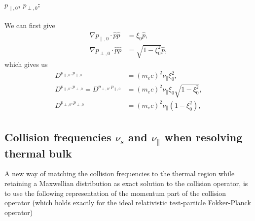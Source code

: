 \documentclass[11pt,a4paper]{article}
\begin{document}
\paragraph{$p_{\parallel,0}$, $p_{\perp,0}$:}
We can first give
\begin{align}
\nabla p_{\parallel,0} \cdot \hat{p}\hat{p} &= \xi_0 \hat{p} , \nonumber \\
\nabla p_{\perp,0} \cdot \hat{p}\hat{p} &= \sqrt{1-\xi_0^2}\hat{p},
\end{align}
which gives us
\begin{align}
D^{p_{\parallel,0},p_{\parallel,0}} &= (m_e c)^2 \nu_\parallel \xi_0^2, \nonumber \\
D^{p_{\parallel,0},p_{\perp,0}} = D^{p_{\perp,0},p_{\parallel,0}} &= (m_e c)^2 \nu_\parallel \xi_0\sqrt{1-\xi_0^2}, \nonumber \\
D^{p_{\perp,0},p_{\perp,0}} &= (m_e c)^2 \nu_\parallel(1- \xi_0^2), \nonumber \\
\end{align}

\subsection{Collision frequencies $\nu_s$ and $\nu_\parallel$ when resolving thermal bulk}
A new way of matching the collision frequencies to the thermal region while retaining a Maxwellian distribution as exact solution to the collision operator, is to use the following representation of the momentum part of the collision operator (which holds exactly for the ideal relativistic test-particle Fokker-Planck operator)
\end{document}
